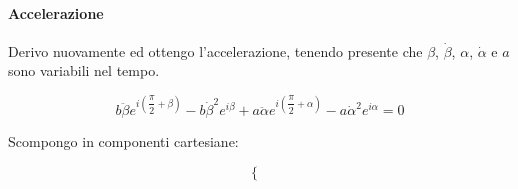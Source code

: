 \documentclass[main.tex]{subfiles}
\begin{document}
\paragraph{Accelerazione} Derivo nuovamente ed ottengo l'accelerazione, tenendo presente che $\beta$, $\dot{\beta}$, $\alpha$, $\dot{\alpha}$ e $a$ sono variabili nel tempo.

\[
	b\ddot{\beta}e^{i\left ( \dfrac{\pi}{2} + \beta \right )} - b\dot{\beta}^2e^{i\beta} + a\ddot{\alpha}e^{i\left ( \dfrac{\pi}{2} + \alpha \right )} - a\dot{\alpha}^2e^{i\alpha} = 0
\]

Scompongo in componenti cartesiane:

\[
\begin{cases}
\end{cases}
\]
\end{document}
